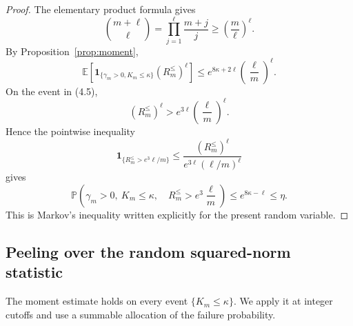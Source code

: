 \documentclass[11pt]{article}
\theoremstyle{definition}
\theoremstyle{remark}
\newcommand{\E}{\mathbb E}
\newcommand{\Pp}{\mathbb P}
\newcommand{\one}{\mathbf 1}
\begin{document}
\begin{proof}
The elementary product formula gives
\[
 \binom{m+\ell}{\ell}
 =
 \prod_{j=1}^{\ell}\frac{m+j}{j}
 \ge
 \left(\frac m\ell\right)^\ell.
\]
By Proposition~\ref{prop:moment},
\[
 \E\left[
   \one_{\{\gamma_m>0,K_m\le \kappa\}}
   (R_m^{\le})^\ell
 \right]
 \le
 e^{8\kappa+2\ell}
 \left(\frac\ell m\right)^\ell.
\]
On the event in (4.5),
\[
 (R_m^{\le})^\ell
 >
 e^{3\ell}\left(\frac\ell m\right)^\ell.
\]
Hence the pointwise inequality
\[
 \one_{\{R_m^{\le}>e^3\ell/m\}}
 \le
 \frac{(R_m^{\le})^\ell}
      {e^{3\ell}(\ell/m)^\ell}
\]
gives
\[
 \Pp\left(
   \gamma_m>0,\ K_m\le \kappa,\quad
   R_m^{\le}>e^3\frac\ell m
 \right)
 \le
 e^{8\kappa-\ell}
 \le
 \eta.
\]
This is Markov's inequality written explicitly for the present random
variable.
\end{proof}

\subsection{Peeling over the random squared-norm statistic}

The moment estimate holds on every event \(\{K_m\le\kappa\}\). We apply it
at integer cutoffs and use a summable allocation of the failure
probability.
\end{document}
